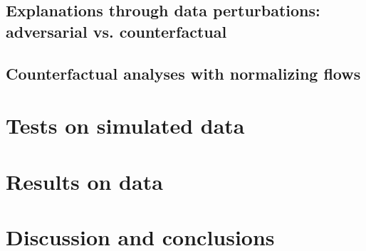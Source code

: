 \documentclass[prd,aps,10pt,nofootinbib,twocolumn,superscriptaddress,preprintnumbers,balancelastpage,longbibliography,floatfix]{revtex4-2}
\begin{document}
\subsection{Explanations through data perturbations: adversarial vs. counterfactual}

\subsection{Counterfactual analyses with normalizing flows}

\section{Tests on simulated data}

\section{Results on \Fermi data}

\section{Discussion and conclusions}
\label{sec:conclusion}

\vspace{.2cm}

\begin{acknowledgments}
\end{acknowledgments}

\vspace{.5cm}



\end{document}
